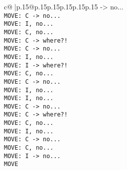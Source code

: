 \documentclass{article}
\begin{document}
{\begin{supertabular}{c@{$\;$}|p{.15\linewidth}@{}p{.15\linewidth}p{.15\linewidth}p{.15\linewidth}p{.15\linewidth}p{.15\linewidth}}
{{{ -> no...\\ \tt  MOVE: C -> no...\\ \tt  MOVE: I, no...\\ \tt  MOVE: C, no...\\ \tt  MOVE: C -> where?!\\ \tt  MOVE: C -> no...\\ \tt  MOVE: I, no...\\ \tt  MOVE: I -> where?!\\ \tt  MOVE: C, no...\\ \tt  MOVE: C -> no...\\ \tt  MOVE: I, no...\\ \tt  MOVE: I, no...\\ \tt  MOVE: C -> no...\\ \tt  MOVE: C -> where?!\\ \tt  MOVE: C, no...\\ \tt  MOVE: I, no...\\ \tt  MOVE: C -> no...\\ \tt  MOVE: C, no...\\ \tt  MOVE: I -> no...\\ \tt  MOVE}}}
\end{supertabular}}
\end{document}
